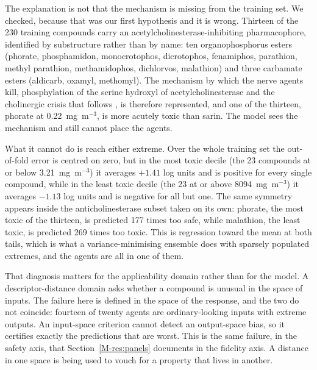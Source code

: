 \documentclass[11pt,a4paper]{article}
\begin{document}
\begin{sloppypar}
The explanation is not that the mechanism is missing from the training set. We
checked, because that was our first hypothesis and it is wrong. Thirteen of the
230 training compounds carry an acetylcholinesterase-inhibiting pharmacophore,
identified by substructure rather than by name: ten organophosphorus esters
(phorate, phosphamidon, monocrotophos, dicrotophos, fenamiphos, parathion,
methyl parathion, methamidophos, dichlorvos, malathion) and three carbamate
esters (aldicarb, oxamyl, methomyl). The mechanism by which the nerve agents
kill, phosphylation of the serine hydroxyl of acetylcholinesterase and the
cholinergic crisis that follows \cite{bajgar2004,thiermann2013,worek2020},
is therefore represented, and one of
the thirteen, phorate at 0.22~mg~m$^{-3}$, is more acutely toxic than sarin. The
model sees the mechanism and still cannot place the agents.
\end{sloppypar}

What it cannot do is reach either extreme. Over the whole training set the
out-of-fold error is centred on zero, but in the most toxic decile
(the 23 compounds at or below 3.21~mg~m$^{-3}$) it averages $+1.41$ log units
and is positive for every single compound, while in the least toxic decile (the
23 at or above 8094~mg~m$^{-3}$) it averages $-1.13$ log units and is negative
for all but one. The same symmetry appears inside the anticholinesterase subset
taken on its own: phorate, the most toxic of the thirteen, is predicted 177 times
too safe, while malathion, the least toxic, is predicted 269 times too toxic.
This is regression toward the mean at both tails, which is what a
variance-minimising ensemble does with sparsely populated extremes, and the
agents are all in one of them.

That diagnosis matters for the applicability domain rather than for the model.
A descriptor-distance domain asks whether a compound is unusual in the space of
inputs. The failure here is defined in the space of the response, and the two do
not coincide: fourteen of twenty agents are ordinary-looking inputs with
extreme outputs. An input-space criterion cannot detect an output-space bias, so
it certifies exactly the predictions that are worst. This is the same failure, in
the safety axis, that Section~\ref{M-res:panels} documents in the fidelity axis.
A distance in one space is being used to vouch for a property that lives in
another.
\end{document}
